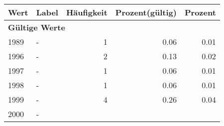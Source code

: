      \begin{longtable}{lXrrr}
     \toprule
     \textbf{Wert} & \textbf{Label} & \textbf{Häufigkeit} & \textbf{Prozent(gültig)} & \textbf{Prozent} \\
     \endhead
     \midrule
     \multicolumn{5}{l}{\textbf{Gültige Werte}}\\

     1989 &
     \multicolumn{1}{X}{ -  } &


       \num{1} &
       \num[round-mode=places,round-precision=2]{0,06} &
         \num[round-mode=places,round-precision=2]{0,01} \\

     1996 &
     \multicolumn{1}{X}{ -  } &


       \num{2} &
       \num[round-mode=places,round-precision=2]{0,13} &
         \num[round-mode=places,round-precision=2]{0,02} \\

     1997 &
     \multicolumn{1}{X}{ -  } &


       \num{1} &
       \num[round-mode=places,round-precision=2]{0,06} &
         \num[round-mode=places,round-precision=2]{0,01} \\

     1998 &
     \multicolumn{1}{X}{ -  } &


       \num{1} &
       \num[round-mode=places,round-precision=2]{0,06} &
         \num[round-mode=places,round-precision=2]{0,01} \\

     1999 &
     \multicolumn{1}{X}{ -  } &


       \num{4} &
       \num[round-mode=places,round-precision=2]{0,26} &
         \num[round-mode=places,round-precision=2]{0,04} \\

     2000 &
     \multicolumn{1}{X}{ -  } &



\end{longtable}
